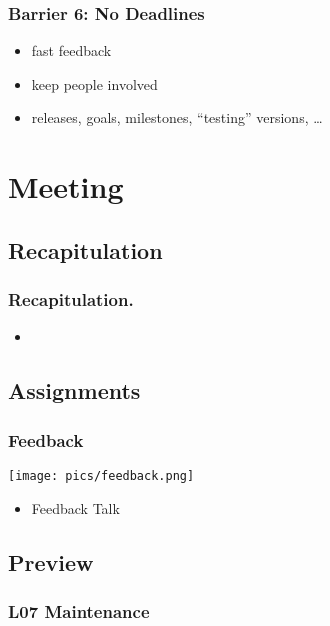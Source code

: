 \begin{frame}
	\frametitle{Barrier 6: No Deadlines}

	\begin{itemize}[<+-| alert@+>]
	\item fast feedback
	\item keep people involved
	\item releases, goals, milestones, ``testing'' versions, \dots
	\end{itemize}
\end{frame}



\section{Meeting}

\subsection{Recapitulation}

\begin{frame}
	\frametitle{Recapitulation.}
	\begin{itemize}
		\item 
	\end{itemize}
\end{frame}

\subsection{Assignments}

\begin{frame}
	\frametitle{Feedback}

	\hfill \texttt{[image: pics/feedback.png]}
	\vspace{-1cm}
	\begin{itemize}
		\item Feedback Talk
	\end{itemize}
\end{frame}

\subsection{Preview}

\begin{frame}
	\frametitle{L07 Maintenance}
\end{frame}


\appendix

\begin{frame}[allowframebreaks]
	
	
\end{frame}



